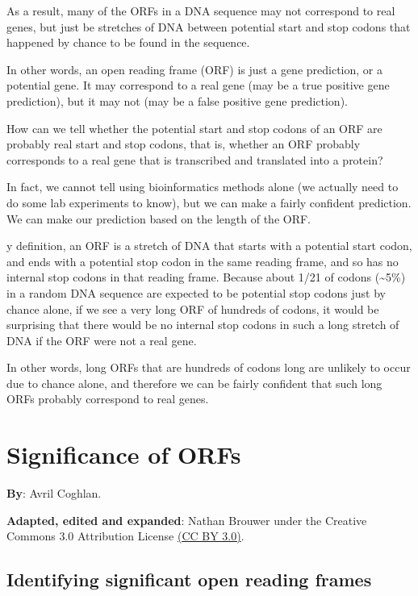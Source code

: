 \documentclass[
]{book}
\begin{document}
As a result, many of the ORFs in a DNA sequence may not correspond to real genes, but just be stretches of DNA between potential start and stop codons that happened by chance to be found in the sequence.

In other words, an open reading frame (ORF) is just a gene prediction, or a potential gene. It may correspond to a real gene (may be a true positive gene prediction), but it may not (may be a false positive gene prediction).

How can we tell whether the potential start and stop codons of an ORF are probably real start and stop codons, that is, whether an ORF probably corresponds to a real gene that is transcribed and translated into a protein?

In fact, we cannot tell using bioinformatics methods alone (we actually need to do some lab experiments to know), but we can make a fairly confident prediction. We can make our prediction based on the length of the ORF.

y definition, an ORF is a stretch of DNA that starts with a potential start codon, and ends with a potential stop codon in the same reading frame, and so has no internal stop codons in that reading frame. Because about 1/21 of codons (\textasciitilde5\%) in a random DNA sequence are expected to be potential stop codons just by chance alone, if we see a very long ORF of hundreds of codons, it would be surprising that there would be no internal stop codons in such a long stretch of DNA if the ORF were not a real gene.

In other words, long ORFs that are hundreds of codons long are unlikely to occur due to chance alone, and therefore we can be fairly confident that such long ORFs probably correspond to real genes.

\hypertarget{significance-of-orfs}{%
\chapter{Significance of ORFs}\label{significance-of-orfs}}

\textbf{By}: Avril Coghlan.

\textbf{Adapted, edited and expanded}: Nathan Brouwer under the Creative Commons 3.0 Attribution License \href{https://creativecommons.org/licenses/by/3.0/}{(CC BY 3.0)}.

\hypertarget{identifying-significant-open-reading-frames}{%
\section{Identifying significant open reading frames}\label{identifying-significant-open-reading-frames}}
\end{document}
